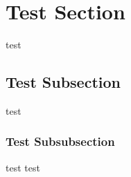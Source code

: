 \section{Test Section}
test
\subsection{Test Subsection}
test
\subsubsection{Test Subsubsection}
test
test